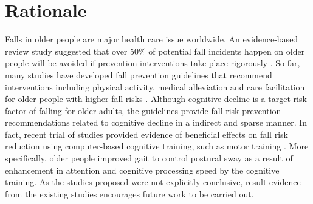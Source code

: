 \documentclass{article}
\begin{document}
\section{Rationale}
\begin{comment}
Aim: To explain why the research questions/aim(s) being addressed are important and why closely related questions are not being covered. 
This should include:
•	A clear explanation of the research question/aim(s) and the justification of the study i.e. why the question is worth asking and, through consultation with public and patient groups, why this is worthwhile to participants or wider service delivery.
•	A contextual framing of the research question/aim(s) in relation to relevant policy and historical and/or literature bases.
\end{comment}

Falls in older people are major health care issue worldwide. An evidence-based review study suggested that over 50\% of potential fall incidents happen on older people will be avoided if prevention interventions take place rigorously \cite{Kannus_2005}. So far, many studies have developed fall prevention guidelines that recommend interventions including physical activity, medical alleviation and care facilitation for older people with higher fall risks \cite{Jung_2014, PreventionofFalls2011,Church_2015}. Although cognitive decline is a target risk factor of falling for older adults, the guidelines provide fall risk prevention recommendations related to cognitive decline in a indirect and sparse manner. In fact, recent trial of studies provided evidence of beneficial effects on fall risk reduction using computer-based cognitive training, such as motor training \cite{van_het_Reve_2014, Barban_2017}. More specifically, older people improved gait to control postural sway as a result of enhancement in attention and cognitive processing speed by the cognitive training. As the studies proposed were not explicitly conclusive, result evidence from the existing studies encourages future work to be carried out. 
\end{document}
